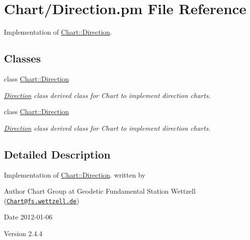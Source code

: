 \hypertarget{Direction_8pm}{
\section{Chart/Direction.pm File Reference}
\label{Direction_8pm}
}


Implementation of \hyperlink{classChart_1_1Direction}{Chart::Direction}.  


\subsection*{Classes}
\begin{DoxyCompactItemize}
\item 
class \hyperlink{classChart_1_1Direction}{Chart::Direction}
\begin{DoxyCompactList}\small\item\em \hyperlink{classChart_1_1Direction}{Direction} class derived class for Chart to implement direction charts. \item\end{DoxyCompactList}\item 
class \hyperlink{classChart_1_1Direction}{Chart::Direction}
\begin{DoxyCompactList}\small\item\em \hyperlink{classChart_1_1Direction}{Direction} class derived class for Chart to implement direction charts. \item\end{DoxyCompactList}\end{DoxyCompactItemize}


\subsection{Detailed Description}
Implementation of \hyperlink{classChart_1_1Direction}{Chart::Direction}. written by \begin{DoxyAuthor}{Author}
Chart Group at Geodetic Fundamental Station Wettzell (\href{mailto:Chart@fs.wettzell.de}{\tt Chart@fs.wettzell.de}) 
\end{DoxyAuthor}
\begin{DoxyDate}{Date}
2012-\/01-\/06 
\end{DoxyDate}
\begin{DoxyVersion}{Version}
2.4.4 
\end{DoxyVersion}
